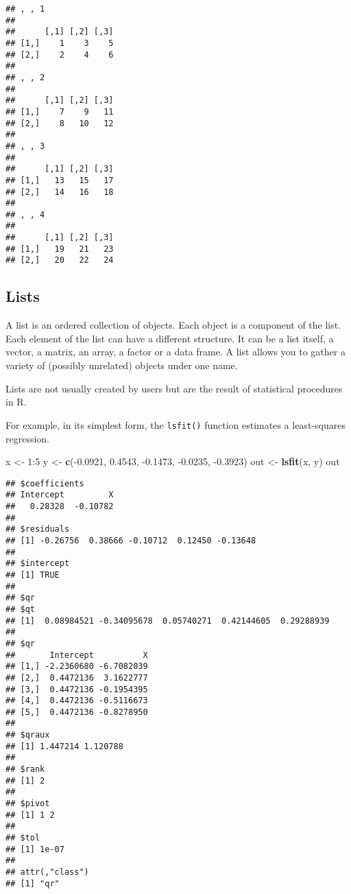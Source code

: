 \documentclass[]{book}
\newenvironment{Shaded}{\begin{snugshade}}{\end{snugshade}}
\newcommand{\KeywordTok}[1]{\textcolor[rgb]{0.13,0.29,0.53}{\textbf{{#1}}}}
\newcommand{\DecValTok}[1]{\textcolor[rgb]{0.00,0.00,0.81}{{#1}}}
\newcommand{\FloatTok}[1]{\textcolor[rgb]{0.00,0.00,0.81}{{#1}}}
\newcommand{\StringTok}[1]{\textcolor[rgb]{0.31,0.60,0.02}{{#1}}}
\newcommand{\NormalTok}[1]{{#1}}
\begin{document}
\begin{verbatim}
## , , 1
## 
##      [,1] [,2] [,3]
## [1,]    1    3    5
## [2,]    2    4    6
## 
## , , 2
## 
##      [,1] [,2] [,3]
## [1,]    7    9   11
## [2,]    8   10   12
## 
## , , 3
## 
##      [,1] [,2] [,3]
## [1,]   13   15   17
## [2,]   14   16   18
## 
## , , 4
## 
##      [,1] [,2] [,3]
## [1,]   19   21   23
## [2,]   20   22   24
\end{verbatim}

\subsection{Lists}\label{lists}

A list is an ordered collection of objects. Each object is a component
of the list. Each element of the list can have a different structure. It
can be a list itself, a vector, a matrix, an array, a factor or a data
frame. A list allows you to gather a variety of (possibly unrelated)
objects under one name.

Lists are not usually created by users but are the result of statistical
procedures in R.

For example, in its simplest form, the \texttt{lsfit()} function
estimates a least-squares regression.

\begin{Shaded}
\begin{Highlighting}[]
\NormalTok{x <-}\StringTok{ }\DecValTok{1}\NormalTok{:}\DecValTok{5}
\NormalTok{y <-}\StringTok{ }\KeywordTok{c}\NormalTok{(-}\FloatTok{0.0921}\NormalTok{, }\FloatTok{0.4543}\NormalTok{, -}\FloatTok{0.1473}\NormalTok{, -}\FloatTok{0.0235}\NormalTok{, -}\FloatTok{0.3923}\NormalTok{)}
\NormalTok{out <-}\StringTok{ }\KeywordTok{lsfit}\NormalTok{(x, y)}
\NormalTok{out}
\end{Highlighting}
\end{Shaded}

\begin{verbatim}
## $coefficients
## Intercept         X 
##   0.28328  -0.10782 
## 
## $residuals
## [1] -0.26756  0.38666 -0.10712  0.12450 -0.13648
## 
## $intercept
## [1] TRUE
## 
## $qr
## $qt
## [1]  0.08984521 -0.34095678  0.05740271  0.42144605  0.29288939
## 
## $qr
##       Intercept          X
## [1,] -2.2360680 -6.7082039
## [2,]  0.4472136  3.1622777
## [3,]  0.4472136 -0.1954395
## [4,]  0.4472136 -0.5116673
## [5,]  0.4472136 -0.8278950
## 
## $qraux
## [1] 1.447214 1.120788
## 
## $rank
## [1] 2
## 
## $pivot
## [1] 1 2
## 
## $tol
## [1] 1e-07
## 
## attr(,"class")
## [1] "qr"
\end{verbatim}
\end{document}
